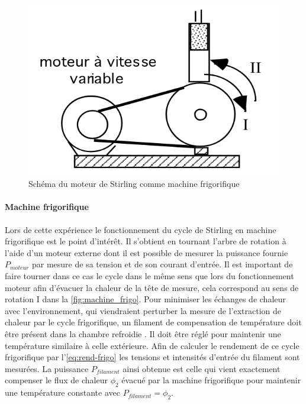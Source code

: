 \begin{figure}
    \centering
    \vspace{-0.5cm}
    \includegraphics[width=\linewidth]{figures/machine-frigo.png}
    \caption{Schéma du moteur de Stirling comme machine frigorifique \cite{notice}}
    \label{fig:machine_frigo}
    \vspace{-0.5cm}
\end{figure}

\paragraph*{Machine frigorifique}
Lors de cette expérience le fonctionnement du cycle de Stirling en machine frigorifique est le point d'intérêt. Il s'obtient en tournant l'arbre de rotation à l'aide d'un moteur externe dont il est possible de mesurer la puissance fournie \(P_{moteur}\) par mesure de sa tension et de son courant d'entrée. Il est important de faire tourner dans ce cas le cycle dans le même sens que lors du fonctionnement moteur afin d'évacuer la chaleur de la tête de mesure, cela correspond au sens de rotation I dans la \autoref{fig:machine_frigo}. Pour minimiser les échanges de chaleur avec l'environnement, qui viendraient perturber la mesure de l'extraction de chaleur par le cycle frigorifique, un filament de compensation de température doit être présent dans la chambre refroidie \cite{notice}. Il doit être réglé pour maintenir une température similaire à celle extérieure. Afin de calculer le rendement de ce cycle frigorifique par l'\autoref{eq:rend-frigo} les tensions et intensités d'entrée du filament sont mesurées. La puissance \(P_{filament}\) ainsi obtenue est celle qui vient exactement compenser le flux de chaleur \(\phi_2\) évacué par la machine frigorifique pour maintenir une température constante avec \(P_{filament} = \phi_2\).
